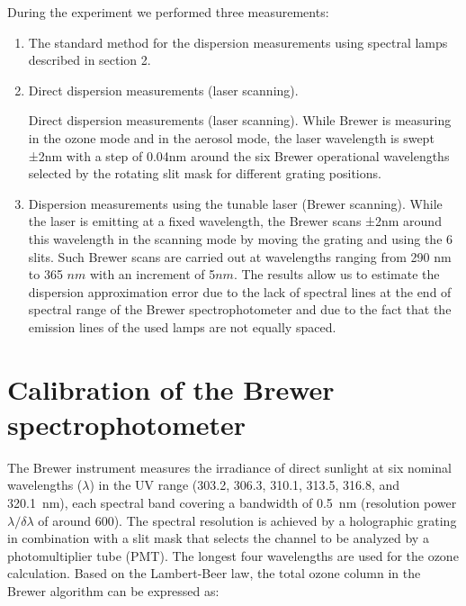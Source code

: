 \documentclass[acp, manuscript]{copernicus}
\begin{document}
During the experiment we performed three measurements: 
\begin{enumerate}


\item The standard method for the dispersion measurements using spectral lamps described in section 2.

\item  Direct dispersion measurements (laser scanning). 

Direct dispersion measurements (laser scanning). While Brewer is measuring in the ozone mode and in the aerosol mode, the laser wavelength is swept ±2\unit{nm} with a step of 0.04\unit{nm} around the six Brewer operational wavelengths selected by the rotating slit mask for different grating positions.



\item  Dispersion measurements using the tunable laser (Brewer scanning). While the laser is emitting at a fixed wavelength, the Brewer scans ±2\unit{nm} around this wavelength in the scanning mode by moving the grating and using the 6 slits. Such Brewer scans are carried out at wavelengths ranging from 290 \unit{nm} to 365 $\unit{nm}$ with an increment of 5$\unit{nm}$. The results allow us to estimate the dispersion approximation error due to the lack of spectral lines at the end of spectral range of the Brewer spectrophotometer and due to the fact that the emission lines of the used lamps are not equally spaced.

\end{enumerate}







\section{Calibration of the Brewer spectrophotometer}
\label{sec:calibration}


The Brewer instrument measures the irradiance of direct sunlight at six nominal wavelengths ($\lambda$) in the UV range (303.2, 306.3, 310.1, 313.5, 316.8, and 320.1~\unit{nm}), each spectral band covering a bandwidth of 0.5~\unit{nm} (resolution power $\lambda/\delta\lambda$ of around 600). The spectral resolution is achieved by a holographic grating in combination with a slit mask that selects the channel to be analyzed by a photomultiplier tube (PMT). The longest four wavelengths are used for the ozone calculation. Based on the Lambert-Beer law, the total ozone column in the Brewer algorithm can be expressed as:
\end{document}
